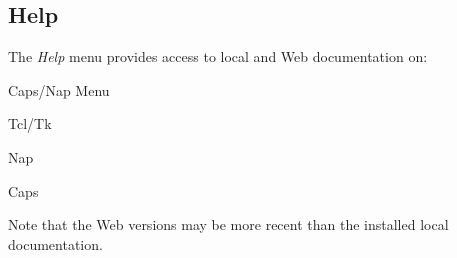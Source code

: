   \subsection{Help}
    \label{caps-nap-menu-Help}

The 
  \emph{Help} menu provides access to local and Web documentation on:
\begin{bullets}
    \item Caps/Nap Menu
    \item Tcl/Tk
    \item Nap
    \item Caps
\end{bullets}
Note that the Web versions may be more recent than the installed
  local documentation.
